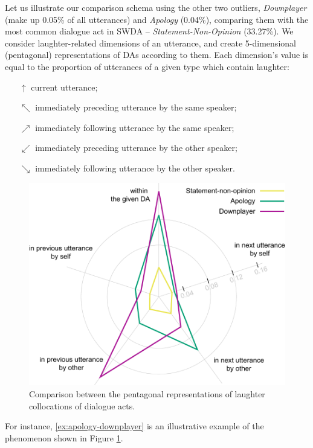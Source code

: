 \documentclass[11pt,a4paper]{article}
\begin{document}
Let us illustrate our comparison schema using the other two outliers,
\emph{Downplayer} (make up 0.05\% of all utterances) and \emph{Apology} (0.04\%), comparing them with the most common dialogue
act in SWDA -- \emph{Statement-Non-Opinion} (33.27\%).  We consider
laughter-related dimensions of an utterance, and create 5-dimensional
(pentagonal) representations of DAs according to them. Each
dimension's value is equal to the proportion of utterances of a given
type which contain laughter:
\begin{itemize}
\setlength\itemsep{0em}
\item[$\uparrow$] current utterance;
\item[$\nwarrow$] immediately preceding utterance by the same speaker;
\item[$\nearrow$] immediately following utterance by the same speaker;
\item[$\swarrow$] immediately preceding utterance by the other speaker;
\item[$\searrow$] immediately following utterance by the other speaker.
\end{itemize}

\begin{figure}
  \includegraphics[width=\linewidth]{img/orbit-apology.pdf}
  \caption{Comparison between the pentagonal representations of laughter collocations of dialogue acts.}
  \label{fig:orbit}
\end{figure}



For instance, \ref{ex:apology-downplayer} is an illustrative example
of the phenomenon shown in Figure \ref{fig:orbit}.
\end{document}
